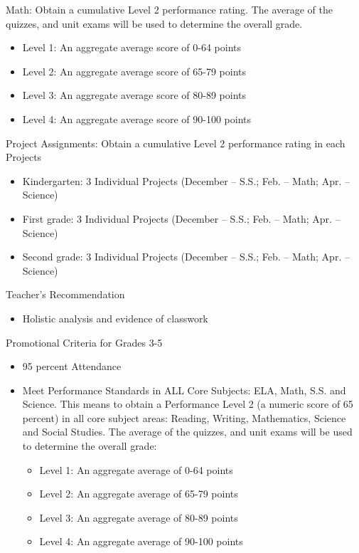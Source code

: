\documentclass[12pt,letterpaper]{article}
\begin{document}
Math: Obtain a cumulative Level 2 performance rating. The average of the quizzes, and unit exams will be used to determine the overall grade.
\begin{itemize}
\item Level 1: An aggregate average score of 0-64 points
\item Level 2: An aggregate average score of 65-79 points
\item Level 3: An aggregate average score of 80-89 points
\item Level 4: An aggregate average score of 90-100 points
\end{itemize}
\pagebreak
\vspace*{1.5cm}
Project Assignments: Obtain a cumulative Level 2 performance rating in each Projects
\begin{itemize}
\item Kindergarten: 3 Individual Projects (December – S.S.; Feb. – Math; Apr. – Science)
\item First grade: 3 Individual Projects (December – S.S.; Feb. – Math; Apr. – Science)
\item Second grade: 3 Individual Projects (December – S.S.; Feb. – Math; Apr. – Science)
\end{itemize}
Teacher’s Recommendation
\begin{itemize}
\item Holistic analysis and evidence of classwork
\end{itemize}
Promotional Criteria for Grades 3-5
\begin{itemize}
\item 95 percent Attendance
\item Meet Performance Standards in ALL Core Subjects: ELA, Math, S.S. and Science. This means to obtain a Performance Level 2 (a numeric score of 65 percent) in all core subject areas: Reading, Writing, 
Mathematics, Science and Social Studies. The average of the quizzes, and unit exams will be used to determine the overall grade:
	\begin{itemize}
	\item Level 1: An aggregate average of 0-64 points
	\item Level 2: An aggregate average of 65-79 points
	\item Level 3: An aggregate average of 80-89 points
	\item Level 4: An aggregate average of 90-100 points
	\end{itemize}
\end{itemize}
\end{document}
